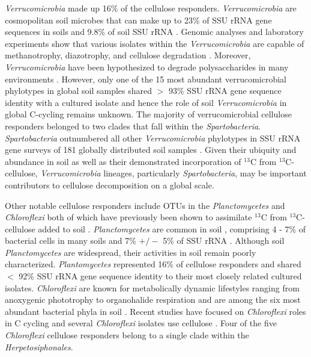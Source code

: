 \textit{Verrucomicrobia} made up 16\% of the cellulose responders.
\textit{Verrucomicrobia} are cosmopolitan soil microbes \citep{Bergmann_2011}
that can make up to 23\% of SSU rRNA gene sequences in soils
\citep{Bergmann_2011} and 9.8\% of soil SSU rRNA \citep{Buckley_2001}. Genomic
analyses and laboratory experiments show that various isolates
within the \textit{Verrucomicrobia} are capable of methanotrophy, diazotrophy,
and cellulose degradation \citep{Wertz_2011,Otsuka_2012}. Moreover,
\textit{Verrucomicrobia} have been hypothesized to degrade polysaccharides in
many environments \citep{Fierer_2013,10543821,Herlemann_2013}. However, only
one of the 15 most abundant verrucomicrobial phylotypes in global soil samples
shared $>$ 93\% SSU rRNA gene sequence identity with
a cultured isolate \citep{Bergmann_2011} and hence the role of soil
\textit{Verrucomicrobia} in global C-cycling remains unknown. The majority of
verrucomicrobial cellulose responders belonged to two clades that fall
within the \textit{Spartobacteria}. \textit{Spartobacteria} outnumbered
all other \textit{Verrucomicrobia} phylotypes in SSU rRNA gene surveys of
181 globally distributed soil samples \citep{Bergmann_2011}. Given their ubiquity and abundance
in soil as well as their demonstrated incorporation of $^{13}$C from
$^{13}$C-cellulose, \textit{Verrucomicrobia} lineages, particularly
\textit{Spartobacteria}, may be important contributors to cellulose
decomposition on a global scale. 

Other notable cellulose responders include OTUs in the \textit{Planctomycetes}
and \textit{Chloroflexi} both of which have previously been shown to
assimilate $^{13}$C from $^{13}$C-cellulose added to soil
\citep{Schellenberger_2010}. \textit{Planctomycetes} are common in soil
\citep{Janssen2006}, comprising 4 - 7\% of bacterial cells in many soils
\citep{Zarda_1997,Chatzinotas_1998} and 7\% $+/-$ 5\% of SSU rRNA
\citep{buckley_2003}. Although soil \textit{Planctomycetes} are widespread,
their activities in soil remain poorly characterized. \textit{Plantomycetes}
represented 16\% of cellulose responders and shared $<$ 92\% SSU rRNA gene
sequence identity to their most closely related cultured isolates.
\textit{Chloroflexi} are known for metabolically dynamic lifestyles ranging
from anoxygenic phototrophy to organohalide respiration \citep{Hug_2013} and
are among the six most abundant bacterial phyla in soil \citep{Janssen2006}.
Recent studies have focused on \textit{Chloroflexi} roles in C cycling
\citep{Hug_2013,Goldfarb_2011,Cole_2013} and several \textit{Chloroflexi}
isolates use cellulose \citep{Hug_2013,Goldfarb_2011,Cole_2013}. Four
of the five \textit{Chloroflexi} cellulose responders belong to a single clade
within the \textit{Herpetosiphonales}. 

